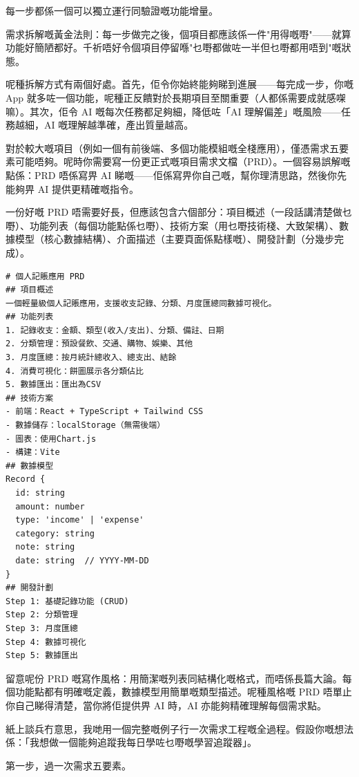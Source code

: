 每一步都係一個可以獨立運行同驗證嘅功能增量。

需求拆解嘅黃金法則：每一步做完之後，個項目都應該係一件"用得嘅嘢"——就算功能好簡陋都好。千祈唔好令個項目停留喺"乜嘢都做咗一半但乜嘢都用唔到"嘅狀態。

呢種拆解方式有兩個好處。首先，佢令你始終能夠睇到進展——每完成一步，你嘅 App 就多咗一個功能，呢種正反饋對於長期項目至關重要（人都係需要成就感㗎嘛）。其次，佢令 AI 嘅每次任務都足夠細，降低咗「AI 理解偏差」嘅風險——任務越細，AI 嘅理解越準確，產出質量越高。


對於較大嘅項目（例如一個有前後端、多個功能模組嘅全棧應用），僅憑需求五要素可能唔夠。呢時你需要寫一份更正式嘅項目需求文檔（PRD）。一個容易誤解嘅點係：PRD 唔係寫畀 AI 睇嘅——佢係寫畀你自己嘅，幫你理清思路，然後你先能夠畀 AI 提供更精確嘅指令。

一份好嘅 PRD 唔需要好長，但應該包含六個部分：項目概述（一段話講清楚做乜嘢）、功能列表（每個功能點係乜嘢）、技術方案（用乜嘢技術棧、大致架構）、數據模型（核心數據結構）、介面描述（主要頁面係點樣嘅）、開發計劃（分幾步完成）。

\begin{lstlisting}
# 個人記賬應用 PRD
## 項目概述
一個輕量級個人記賬應用，支援收支記錄、分類、月度匯總同數據可視化。
## 功能列表
1. 記錄收支：金額、類型(收入/支出)、分類、備註、日期
2. 分類管理：預設餐飲、交通、購物、娛樂、其他
3. 月度匯總：按月統計總收入、總支出、結餘
4. 消費可視化：餅圖展示各分類佔比
5. 數據匯出：匯出為CSV
## 技術方案
- 前端：React + TypeScript + Tailwind CSS
- 數據儲存：localStorage（無需後端）
- 圖表：使用Chart.js
- 構建：Vite
## 數據模型
Record {
  id: string
  amount: number
  type: 'income' | 'expense'
  category: string
  note: string
  date: string  // YYYY-MM-DD
}
## 開發計劃
Step 1: 基礎記錄功能 (CRUD)
Step 2: 分類管理
Step 3: 月度匯總
Step 4: 數據可視化
Step 5: 數據匯出
\end{lstlisting}

留意呢份 PRD 嘅寫作風格：用簡潔嘅列表同結構化嘅格式，而唔係長篇大論。每個功能點都有明確嘅定義，數據模型用簡單嘅類型描述。呢種風格嘅 PRD 唔單止你自己睇得清楚，當你將佢提供畀 AI 時，AI 亦能夠精確理解每個需求點。


紙上談兵冇意思，我哋用一個完整嘅例子行一次需求工程嘅全過程。假設你嘅想法係：「我想做一個能夠追蹤我每日學咗乜嘢嘅學習追蹤器」。

第一步，過一次需求五要素。


